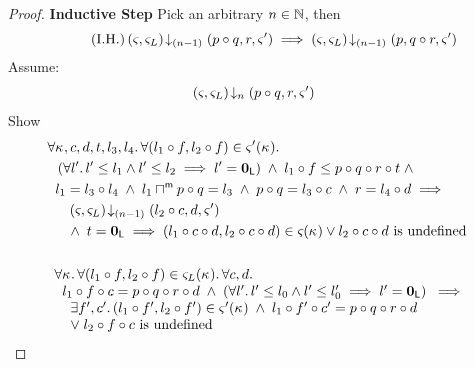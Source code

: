 \begin{lemma}
\begin{proof}
\noindent\textbf{Inductive Step} Pick an arbitrary $n \in \mathbb{N}$, then
%
\begin{equation}
	\tag{I.H.}
	\left(\varsigma_{}, \varsigma_{L}\right) \!\downarrow_{(n-1)} \left(p \circ q, r, \varsigma_{}'\right) \implies 
	\left(\varsigma_{}, \varsigma_{L}\right) \!\downarrow_{(n-1)} \left(p, q \circ r, \varsigma_{}'\right)
\label{L1:IH}
\end{equation}
%
Assume:
%
\begin{align}
	& \left(\varsigma_{}, \varsigma_{L}\right) \!\downarrow_{n} \left(p \circ q, r, \varsigma_{}'\right) \label{L1:Ass1}
\end{align}
%
Show
%
\begin{align}
	&\forall \kappa_{}, c, d, t, l_3, l_4.\, \forall (l_1 \circ f, l_2 \circ f) \in \varsigma_{}'(\kappa_{}).\, \nonumber\\
	&\hspace*{0.2cm}\left(\forall l'.\, l' \leq l_1 \land l' \leq l_2 \implies l' = \mathbf{0}_{\textsf{L}}\right)\;\land\; l_1 \circ f \leq  p \circ q \circ r \circ t \;\land\\
	&\hspace*{0.2cm}  l_1 = l_3 \circ l_4 \;\land\; l_1 \sqcap_{}^{\textsf{m}} p \circ q = l_3 \;\land\; p \circ q = l_3 \circ c \;\land\; r = l_4 \circ d \implies \nonumber\\
	&\hspace*{0.5cm} \left(\varsigma_{}, \varsigma_{L}\right) \!\downarrow_{(n-1)} \left(l_2 \circ c, d, \varsigma_{}'\right)\\
	&\hspace*{0.5cm}\land\;t = \mathbf{0}_{\textsf{L}} \implies (l_1 \circ c \circ d, l_2 \circ c \circ d) \in \varsigma_{}(\kappa_{}) \lor l_2 \circ c \circ d \text{ is undefined} \label{L1:Goal1}\\ \nonumber\\
	& \begin{array}{l}
		\forall \kappa_{}.\, \forall (l_1 \circ f, l_2 \circ f) \in \varsigma_{L}(\kappa_{}).\, \forall c, d.\, \\
  \hspace*{0.2cm} l_1 \circ f \circ c = p \circ q \circ r \circ d \;\land\; \left(\forall l'.\, l' \leq l_0 \land l' \leq l'_0 \implies l' = \mathbf{0}_{\textsf{L}}\right)  \;\implies\\
  \hspace*{0.4cm}\exists f', c'.\, (l_1 \circ f', l_2 \circ f') \in \varsigma_{}'(\kappa_{}) \;\land\; l_1 \circ f' \circ c' =  p \circ q \circ r \circ d\\
		\hspace*{0.4cm}\lor\;l_2 \circ f \circ c \text{ is undefined}\\

\end{array}
\end{align}
\end{proof}
\end{lemma}

